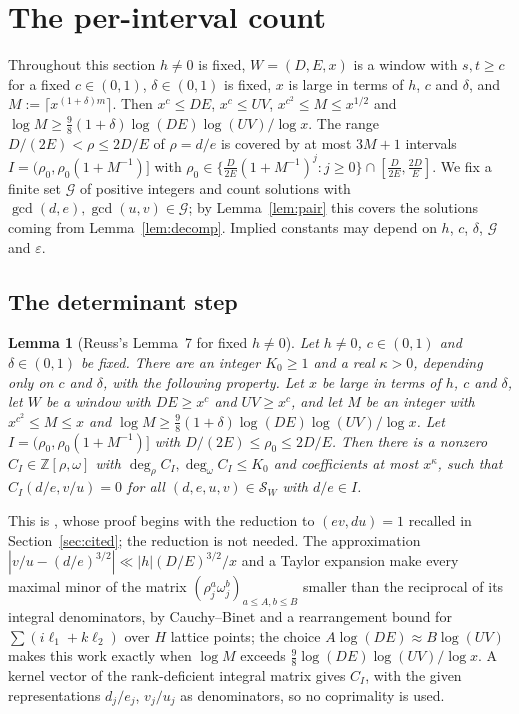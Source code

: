 \documentclass[11pt,reqno]{amsart}
\newtheorem{lemma}[theorem]{Lemma}
\theoremstyle{definition}
\theoremstyle{remark}
\numberwithin{equation}{section}
\newcommand{\Z}{\mathbb Z}
\begin{document}
\section{The per-interval count}\label{sec:interval}

Throughout this section $h\ne0$ is fixed, $W=(D,E,x)$ is a window with
$s,t\ge c$ for a fixed $c\in(0,1)$, $\delta\in(0,1)$ is fixed, $x$ is large
in terms of $h$, $c$ and $\delta$, and $M:=\lceil x^{(1+\delta)m}\rceil$. Then
$x^c\le DE$, $x^c\le UV$, $x^{c^2}\le M\le x^{1/2}$ and
$\log M\ge\frac98(1+\delta)\log(DE)\log(UV)/\log x$. The range $D/(2E)<\rho\le 2D/E$ of
$\rho=d/e$ is covered by at most $3M+1$ intervals
$I=(\rho_0,\rho_0(1+M^{-1})]$ with
$\rho_0\in\{\frac{D}{2E}(1+M^{-1})^j:j\ge0\}\cap[\frac D{2E},\frac{2D}E]$. We fix a
finite set $\mathcal G$ of positive integers and count solutions with
$\gcd(d,e),\gcd(u,v)\in\mathcal G$; by Lemma~\ref{lem:pair} this covers the
solutions coming from Lemma~\ref{lem:decomp}. Implied constants may depend on
$h$, $c$, $\delta$, $\mathcal G$ and $\varepsilon$.

\subsection{The determinant step}
\begin{lemma}[Reuss's Lemma~7 for fixed $h\ne0$]\label{thm:lemma7}
Let $h\ne0$, $c\in(0,1)$ and $\delta\in(0,1)$ be fixed. There are an integer
$K_0\ge1$ and a real $\kappa>0$, depending only on $c$ and $\delta$, with the
following property. Let $x$ be large in terms of $h$, $c$ and $\delta$, let
$W$ be a window with $DE\ge x^c$ and $UV\ge x^c$, and let $M$ be an
integer with $x^{c^2}\le M\le x$ and
$\log M\ge\frac98(1+\delta)\log(DE)\log(UV)/\log x$. Let
$I=(\rho_0,\rho_0(1+M^{-1})]$ with $D/(2E)\le\rho_0\le2D/E$. Then there
is a nonzero $C_I\in\Z[\rho,\omega]$ with $\deg_\rho C_I,\deg_\omega C_I\le K_0$
and coefficients at most $x^{\kappa}$, such that $C_I(d/e,v/u)=0$ for all
$(d,e,u,v)\in\mathcal S_W$ with $d/e\in I$.
\end{lemma}
This is \cite[Lemma~7]{Reuss}, whose proof begins with the reduction to
$(ev,du)=1$ recalled in Section~\ref{sec:cited}; the reduction is not needed.
The approximation $|v/u-(d/e)^{3/2}|\ll|h|(D/E)^{3/2}/x$ and a Taylor
expansion make every maximal minor of the matrix
$(\rho_j^a\omega_j^b)_{a\le A,b\le B}$ smaller than the reciprocal of its
integral denominators, by Cauchy--Binet and a rearrangement bound for
$\sum(i\ell_1+k\ell_2)$ over $H$ lattice points; the choice $A\log(DE)\approx
B\log(UV)$ makes this work exactly when $\log M$ exceeds
$\frac98\log(DE)\log(UV)/\log x$. A kernel vector of the rank-deficient
integral matrix gives $C_I$, with the given representations $d_j/e_j$, $v_j/u_j$
as denominators, so no coprimality is used.
\end{document}
